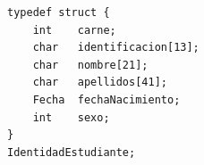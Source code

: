 \begin{lstlisting}[style=pseudocodigo]
typedef struct {
    int    carne;
    char   identificacion[13];
    char   nombre[21];
    char   apellidos[41];
    Fecha  fechaNacimiento;
    int    sexo;
}
IdentidadEstudiante;
\end{lstlisting}
